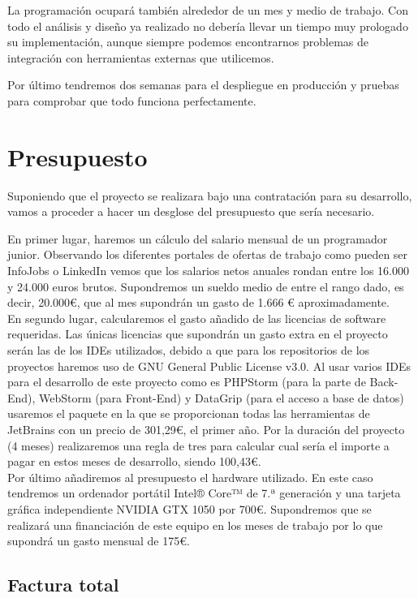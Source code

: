 La programación ocupará también alrededor de un mes y medio de trabajo. Con todo el análisis y diseño ya realizado no debería llevar un tiempo muy prologado su implementación, aunque siempre podemos encontrarnos problemas de integración con herramientas externas que utilicemos.

Por último tendremos dos semanas para el despliegue en producción y pruebas para comprobar que todo funciona perfectamente.

\section{Presupuesto}

Suponiendo que el proyecto se realizara bajo una contratación para su desarrollo, vamos a proceder a hacer un desglose del presupuesto que sería necesario.

En primer lugar, haremos un cálculo del salario mensual de un programador junior. Observando los diferentes portales de ofertas de trabajo como pueden ser InfoJobs o LinkedIn vemos que los salarios netos anuales rondan entre los 16.000 y 24.000 euros brutos. Supondremos un sueldo medio de entre el rango dado, es decir, 20.000€, que al mes supondrán un gasto de 1.666 € aproximadamente.\\

En segundo lugar, calcularemos el gasto añadido de las licencias de software requeridas. Las únicas licencias que supondrán un gasto extra en el proyecto serán las de los IDEs utilizados, debido a que para los repositorios de los proyectos haremos uso de GNU General Public License v3.0. Al usar varios IDEs para el desarrollo de este proyecto como es PHPStorm (para la parte de Back-End), WebStorm (para Front-End) y DataGrip (para el acceso a base de datos) usaremos el paquete en la que se proporcionan todas las herramientas de JetBrains con un precio de 301,29€, el primer año. Por la duración del proyecto (4 meses) realizaremos una regla de tres para calcular cual sería el importe a pagar en estos meses de desarrollo, siendo 100,43€.\\ 

Por último añadiremos al presupuesto el hardware utilizado. En este caso tendremos un ordenador portátil Intel® Core™ de 7.ª generación y una tarjeta gráfica independiente NVIDIA GTX 1050 por 700€. Supondremos que se realizará una financiación de este equipo en los meses de trabajo por lo que supondrá un gasto mensual de 175€.

\subsection{Factura total}

